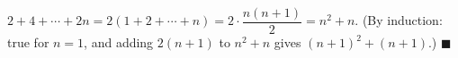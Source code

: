 $2+4+\cdots+2n=2(1+2+\cdots+n)=2\cdot\dfrac{n(n+1)}{2}=n^2+n$. (By induction: true for $n=1$, and adding $2(n+1)$ to $n^2+n$ gives $(n+1)^2+(n+1)$.) $\blacksquare$
